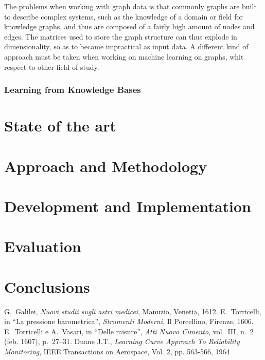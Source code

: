 \documentclass[%
    corpo=13.5pt,
    twoside,
    oldstyle,
    tipotesi=magistrale,
    greek,
    evenboxes
]{toptesi}
\begin{document}
The problems when working with graph data is that commonly graphs
are built to describe complex systems, such as the knowledge of a
domain or field for knowledge graphs, and thus are composed of
a fairly high amount of nodes and edges. The matrices used to
store the graph structure can thus explode in dimensionality, so as
to became impractical as input data.
A different kind of approach must be taken when working on machine
learning on graphs, whit respect to other field of study.


\subsection{Learning from Knowledge Bases}









\chapter{State of the art}

\chapter{Approach and Methodology}

\chapter{Development and Implementation}

\chapter{Evaluation}

\chapter{Conclusions}


\begin{thebibliography}{9}
 G.~Galilei, {\em Nuovi studii sugli astri medicei}, Manuzio,
        Venetia, 1612.
 E.~Torricelli, in ``La pressione barometrica'', {\em Strumenti
        Moderni}, Il Porcellino, Firenze, 1606.
 E.~Torricelli e A.~Vasari, in ``Delle misure'', {\em Atti Nuovo
        Cimento}, vol.~III, n.~2 (feb. 1607), p.~27--31.
 Duane J.T., \emph{Learning Curve Approach To Reliability
		Monitoring}, IEEE Transactions on Aerospace, Vol. 2, pp. 563-566, 1964
\end{thebibliography}
\end{document}
